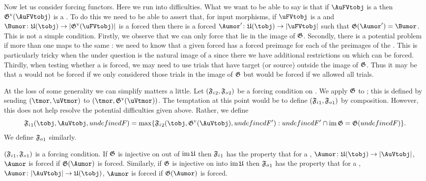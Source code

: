 \documentclass[%
a4paper,%
arxiv,%
defaults
]{myclass}
\begin{document}
Now let us consider forcing functors.
Here we run into difficulties.
What we want to be able to say is that if \(\AuFVtobj\) is a \AuFVtobj then \(\mVo{\subfunc}(\AuFVtobj)\) is a \BuFVtobj.
To do this we need to be able to assert that, for input morphisms, if \(\uFVtobj\) is a \AuFVtobj and \(\Bumor \colon \ufunc(\tobj) \to \sabs{\mVo{\subfunc}(\uFVtobj)}\) is a forced \Bumor then there is a forced \Aumor \(\Aumor' \colon \ufunc(\tobj) \to \sabs{\uFVtobj}\) such that \(\subfunc(\Aumor') = \Bumor\).
This is not a simple condition.
Firstly, we observe that we can only force \Aumors that lie in the image of \(\subfunc\).
Secondly, there is a potential problem if more than one \AuFVtobj maps to the same \BuVtobj: we need to know that a given forced \Bumor has a forced preimage for each of the preimages of the \BuVtobj.
This is particularly tricky when the \BuVtobj under question is the natural image of a \tobj since there we have additional restrictions on which \Bumors can be forced.
Thirdly, when testing whether a \Bumor is forced, we may need to use trials that have target (or source) outside the image of \(\subfunc\).
Thus it may be that a \Bumor would not be forced if we only considered those trials in the image of \(\subfunc\) but would be forced if we allowed all trials.

At the loss of some generality we can simplify matters a little.
Let \((\mBo{\iforce}, \mBo{\oforce})\) be a forcing condition on \BuVtcat.
We apply \(\subfunc\) to \rcat; this is defined by sending \((\tmor, \uVtmor)\) to \((\tmor, \mVo{\subfunc}(\uVtmor))\).
The temptation at this point would be to define \((\mAo{\iforce}, \mAo{\oforce})\) by composition.
However, this does not help resolve the potential difficulties given above.
Rather, we define
%
\[
  \mAo{\iforce}(\tobj, \AuVtobj, \m{F}) = \max\{\mBo{\iforce}(\tobj, \mVo{\subfunc}(\AuVtobj), \m{F}') : \m{F}' \cap \im \subfunc = \subfunc(\m{F}) \}.
\]
%
We define \(\mAo{\oforce}\) similarly.

\begin{lemma}
\label{lem:injforce}
\((\mAo{\iforce}, \mAo{\oforce})\) is a forcing condition.
If \(\subfunc\) is injective on \Aumors out of \(\im \ufunc\) then \(\mAo{\iforce}\) has the property that for a \Aumor, \(\Aumor \colon \ufunc(\tobj) \to \forfunc[\AuVtobj]\), \(\Aumor\) is forced if \(\subfunc(\Aumor)\) is forced.
Similarly, if \(\subfunc\) is injective on \Aumors into \(\im \ufunc\) then \(\mAo{\oforce}\) has the property that for a \Aumor, \(\Aumor \colon \forfunc[\AuVtobj] \to \ufunc(\tobj)\), \(\Aumor\) is forced if \(\subfunc(\Aumor)\) is forced.
\end{lemma}
\end{document}
